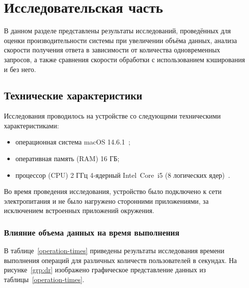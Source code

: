 \section{Исследовательская часть}

В данном разделе представлены результаты исследований, проведённых для оценки производительности системы при увеличении объёма данных, анализа скорости получения ответа в зависимости от количества одновременных запросов, а также сравнения скорости обработки с использованием кэширования и без него.

\subsection{Технические характеристики}

Исследования проводилось на устройстве со следующими техническими характеристиками:

\begin{itemize}[label=---]
	\item операционная система macOS 14.6.1~\cite{macos};
	
	\item оперативная память (RAM) 16 ГБ;
	
	\item процессор (CPU) 2 ГГц 4‑ядерный Intel Core i5 (8 логических ядер)~\cite{intel}.
	
\end{itemize}

Во время проведения исследования, устройство было подключено к сети электропитания и не было нагружено сторонними приложениями, за исключением встроенных приложений окружения.

\subsubsection*{\normalsize  Влияние объема данных на время выполнения}


В таблице~\ref{operation-times} приведены результаты исследования времени выполнения операций для различных количеств пользователей в секундах. На рисунке~\ref{grp:dr} изображено графическое представление данных из таблицы~\ref{operation-times}.

